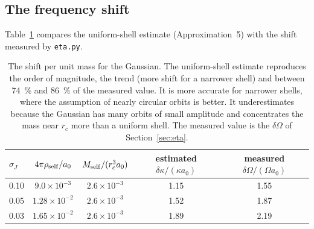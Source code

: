 \documentclass[11pt,a4paper]{article}
\begin{document}
\subsection{The frequency shift}
\label{sec:res_corrimiento}

Table~\ref{tab:corrimiento} compares the uniform-shell estimate (Approximation~5) with
the shift measured by \texttt{eta.py}.

\begin{table}[!htbp]
\centering
\begin{tabular}{lcccc}
\toprule
$\sigma_J$ & $4\pi\rho_{\rm self}/a_0$ & $M_{\rm self}/(r_c^3a_0)$ &
  estimated $\delta\kappa/(\kappa a_0)$ & measured $\delta\Omega/(\Omega a_0)$\\
\midrule
0.10 & $9.0\times10^{-3}$ & $2.6\times10^{-3}$ & 1.15 & 1.55\\
0.05 & $1.28\times10^{-2}$ & $2.6\times10^{-3}$ & 1.52 & 1.87\\
0.03 & $1.65\times10^{-2}$ & $2.6\times10^{-3}$ & 1.89 & 2.19\\
\bottomrule
\end{tabular}
\caption{The shift per unit mass for the Gaussian. The uniform-shell estimate reproduces
the order of magnitude, the trend (more shift for a narrower shell) and between
\SI{74}{\%} and \SI{86}{\%} of the measured value. It is more accurate for narrower shells,
where the assumption of nearly circular orbits is better. It underestimates because the
Gaussian has many orbits of small amplitude and concentrates the mass near $r_c$ more
than a uniform shell. The measured value is the $\delta\Omega$ of Section~\ref{sec:eta}.}
\label{tab:corrimiento}
\end{table}
\end{document}
